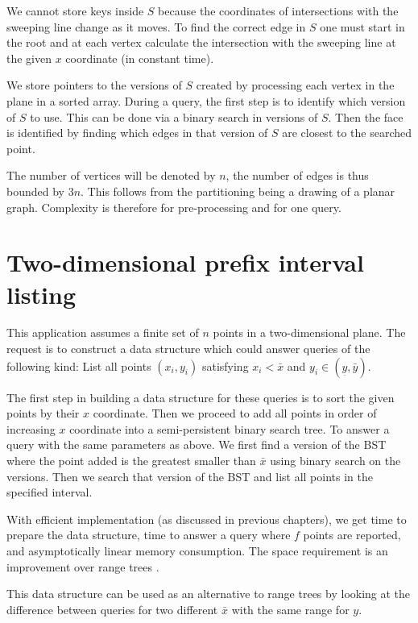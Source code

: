 We cannot store keys inside $S$ because the coordinates of intersections with the sweeping line change as it moves. To find the correct edge in $S$ one must start in the root and at each vertex calculate the intersection with the sweeping line at the given $x$ coordinate (in constant time).

We store pointers to the versions of $S$ created by processing each vertex in the plane in a sorted array. During a query, the first step is to identify which version of $S$ to use. This can be done via a binary search in versions of $S$. Then the face is identified by finding which edges in that version of $S$ are closest to the searched point.

The number of vertices will be denoted by $n$, the number of edges is thus bounded by $3n$. This follows from the partitioning being a drawing of a planar graph. Complexity is therefore  for pre-processing and  for one query.




\section{Two-dimensional prefix interval listing}

This application assumes a finite set of $n$ points in a two-dimensional plane. The request is to construct a data structure which could answer queries of the following kind: List %
all points $(x_i,y_i)$ satisfying $x_i < \bar x$ and $ y_i \in (\underset{\bar{}}{y}, \bar y) $.

The first step in building a data structure for these queries is to sort the given points by their $x$ coordinate. Then we proceed to add all points in order of increasing $x$ coordinate into a semi-persistent binary search tree. To answer a query with the same parameters as above. We first find a version of the BST where the point added is the greatest smaller than $\bar x$ using binary search on the versions. Then we search that version of the BST and list all points in the specified interval.

With efficient implementation (as discussed in previous chapters), we get  time to prepare the data structure,  time to answer a query where $f$ points are reported, and asymptotically linear memory consumption. The space requirement is an improvement over range trees \cite{range-trees}.

This data structure can be used as an alternative to range trees by looking at the difference between queries for two different $\bar x$ with the same range for $y$.

